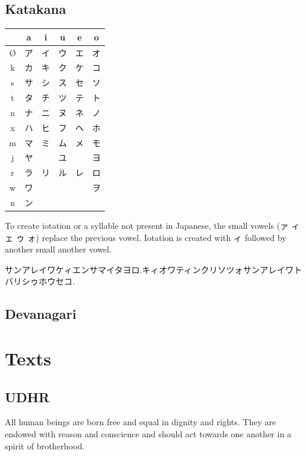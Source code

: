 \documentclass{clgrammar}
\begin{document}
\chapter{Katakana}

\begin{center}
	\renewcommand{\arraystretch}{1.4}
	\begin{tabular}{c|ccccc}
		 & a & i & u & e & o \\ \hline
		 Ø & {\kf ア} & {\kf イ} & {\kf ウ} & {\kf エ} & {\kf オ} \\
		 k & {\kf カ} & {\kf キ} & {\kf ク} & {\kf ケ} & {\kf コ} \\
		 s & {\kf サ} & {\kf シ} & {\kf ス} & {\kf セ} & {\kf ソ} \\
		 t & {\kf タ} & {\kf チ} & {\kf ツ} & {\kf テ} & {\kf ト} \\
		 n & {\kf ナ} & {\kf ニ} & {\kf ヌ} & {\kf ネ} & {\kf ノ} \\
		 x & {\kf ハ} & {\kf ヒ} & {\kf フ} & {\kf ヘ} & {\kf ホ} \\
		 m & {\kf マ} & {\kf ミ} & {\kf ム} & {\kf メ} & {\kf モ} \\
		 j & {\kf ヤ} &  & {\kf ユ} &  & {\kf ヨ} \\
		 r & {\kf ラ} & {\kf リ} & {\kf ル} & {\kf レ} & {\kf ロ} \\
		 w & {\kf ワ} &  &  &  & {\kf ヲ} \\
		 n & {\kf ン} &  &  &  & 
	\end{tabular}
\end{center}

To create iotation or a syllable not present in Japanese, the small vowels ({\kf ァ ィ ェ ゥ ォ}) replace the previous vowel. Iotation is created with {\kf ィ} followed by another small another vowel.

{\kf サンアレイワケィエンサマイタヨロ.キィオワティンクリソツォサンアレイワトバリシゥホウセコ.}

\chapter{Devanagari}

\part{Texts}

\chapter{UDHR}
All human beings are born free and equal in dignity and rights. They are endowed with reason and conscience and should act towards one another in a spirit of brotherhood.
\end{document}
